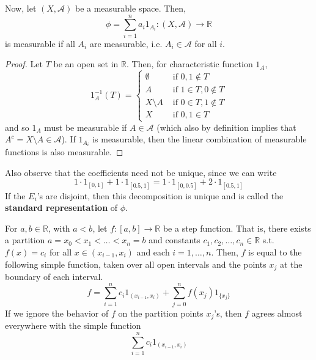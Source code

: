     \begin{lemma}
      Now, let $(X, \mathcal{A})$ be a measurable space. Then, 
      \begin{equation}
        \phi = \sum_{i=1}^n a_i 1_{A_i} : (X, \mathcal{A}) \longrightarrow \mathbb{R}
      \end{equation}
      is measurable if all $A_i$ are measurable, i.e. $A_i \in \mathcal{A}$ for all $i$. 
    \end{lemma}
    \begin{proof}
      Let $T$ be an open set in $\mathbb{R}$. Then, for characteristic function $1_A$, 
      \begin{equation}
        1_A^{-1} (T) = \begin{cases} 
        \emptyset & \text{ if } 0, 1 \not\in T \\
        A & \text{ if } 1 \in T, 0 \not\in T \\
        X \setminus A & \text{ if } 0 \in T, 1 \not\in T \\
        X & \text{ if } 0, 1 \in T
        \end{cases}
      \end{equation}
      and so $1_A$ must be measurable if $A \in \mathcal{A}$ (which also by definition implies that $A^c = X \setminus A \in \mathcal{A}$). If $1_{A_i}$ is measurable, then the linear combination of measurable functions is also measurable. 
    \end{proof}

    Also observe that the coefficients need not be unique, since we can write 
    \begin{equation}
      1 \cdot 1_{[0, 1]} + 1 \cdot 1_{[0.5, 1]} = 1 \cdot 1_{[0, 0.5]} + 2 \cdot 1_{[0.5, 1]}
    \end{equation}
    If the $E_i$'s are disjoint, then this decomposition is unique and is called the \textbf{standard representation} of $\phi$. 

    \begin{example}
      For $a, b \in \mathbb{R}$, with $a < b$, let $f: [a, b] \longrightarrow \mathbb{R}$ be a step function. That is, there exists a partition $a = x_0 < x_1 < \ldots < x_n = b$ and constants $c_1, c_2, \ldots, c_n \in \mathbb{R}$ s.t. $f(x) = c_i$ for all $x \in (x_{i-1}, x_i)$ and each $i = 1, \ldots, n$. Then, $f$ is equal to the following simple function, taken over all open intervals and the points $x_j$ at the boundary of each interval. 
      \begin{equation}
        f = \sum_{i=1}^n c_i 1_{(x_{i-1}, x_i)} + \sum_{j=0}^n f(x_j) 1_{\{x_j\}}
      \end{equation}
      If we ignore the behavior of $f$ on the partition points $x_j$'s, then $f$ agrees almost everywhere with the simple function 
      \begin{equation}
        \sum_{i=1}^n c_i 1_{(x_{i-1}, x_i)}
      \end{equation}
    \end{example}

